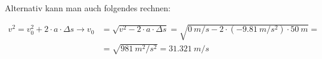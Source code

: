 \begin{aufgabe}
\begin{loesung}
\begin{enumerate}[a)]
		Alternativ kann man auch folgendes rechnen:

		\begin{align*}
		v^2=v_0^2 + 2\cdot a \cdot \Delta s \to v_0 &= \sqrt{v^2 - 2\cdot a \cdot \Delta s}=\sqrt{\SI{0}{m/s} - 2\cdot (\SI{-9.81}{m/s^2})\cdot\SI{50}{m}}=\\
			&=\sqrt{\SI{981}{m^2/s^2}}=\SI{31.321}{m/s}
		\end{align*}
\end{enumerate}


\end{loesung}
\end{aufgabe}
